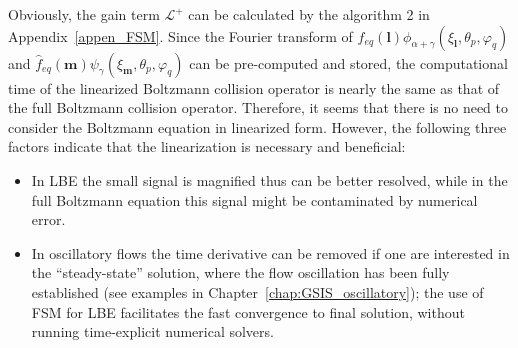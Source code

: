 Obviously, the gain term $\mathcal{L}^+$ can be calculated by the algorithm 2 in Appendix~\ref{appen_FSM}. Since the Fourier transform of  $\hat{f}_{eq}(\bm{l}){\phi_{\alpha+\gamma}(\xi_{\bm{l}},\theta_p,\varphi_q)}$ and $\hat{f}_{eq}(\bm{m}){\psi_{\gamma}(\xi_{\bm{m}},\theta_p,\varphi_q)}$ can be pre-computed and stored, the computational time of the linearized Boltzmann collision operator is nearly the same as that of the full Boltzmann collision operator. Therefore, it seems that there is no need to consider the Boltzmann equation in linearized form. However, the following three factors indicate that the linearization is necessary and beneficial: 
\begin{itemize}
	\item In LBE the small signal is magnified thus can be better resolved, while in the full Boltzmann equation this signal might be contaminated by numerical error.
	
	\item In oscillatory flows the time derivative can be removed if one are interested in the ``steady-state'' solution, where the flow oscillation has been fully established (see examples in Chapter~\ref{chap:GSIS_oscillatory}); the use of FSM for LBE facilitates the fast convergence to final solution, without running time-explicit numerical solvers. 
	

\end{itemize}
